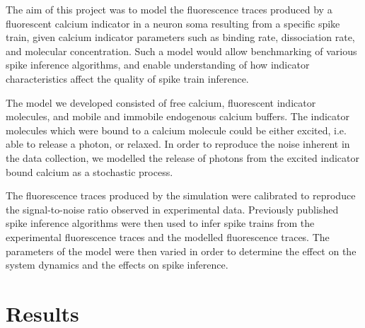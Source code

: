 \documentclass[a4paper,12pt]{article}
\theoremstyle{definition}
\begin{document}
The aim of this project was to model the fluorescence traces produced by a fluorescent calcium indicator in a neuron soma resulting from a specific spike train, given calcium indicator parameters such as binding rate, dissociation rate, and molecular concentration. Such a model would allow benchmarking of various spike inference algorithms, and enable understanding of how indicator characteristics affect the quality of spike train inference.

The model we developed consisted of free calcium, fluorescent indicator molecules, and mobile and immobile endogenous calcium buffers. The indicator molecules which were bound to a calcium molecule could be either excited, i.e. able to release a photon, or relaxed. In order to reproduce the noise inherent in the data collection, we modelled the release of photons from the excited indicator bound calcium as a stochastic process.

The fluorescence traces produced by the simulation were calibrated to reproduce the signal-to-noise ratio observed in experimental data. Previously published spike inference algorithms were then used to infer spike trains from the experimental fluorescence traces and the modelled fluorescence traces. The parameters of the model were then varied in order to determine the effect on the system dynamics and the effects on spike inference.

\section{Results}
\end{document}
